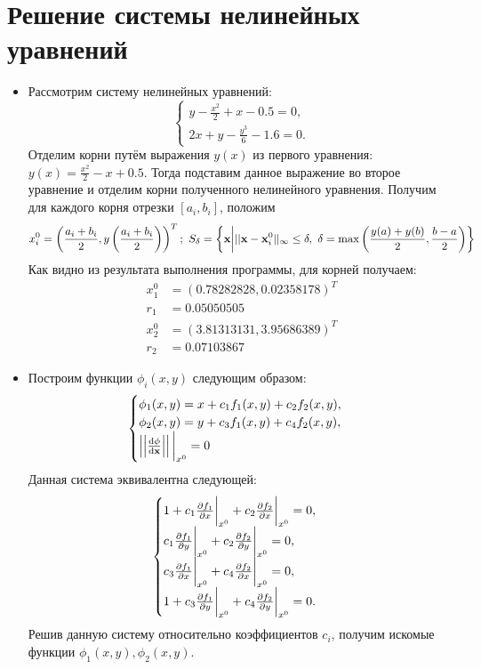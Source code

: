 \documentclass[14pt, a4paper]{article}
\begin{document}
  \section{Решение системы нелинейных уравнений}
  \begin{itemize}
    \item
    Рассмотрим систему нелинейных уравнений:
    $$\begin{cases}y - \frac{x^2}{2} + x - 0.5 = 0, \\ 2x + y - \frac{y^3}{6} - 1.6 = 0.\end{cases}$$
    Отделим корни путём выражения $y(x)$ из первого уравнения: $y(x) = \frac{x^2}{2} - x + 0.5$. Тогда подставим данное выражение во второе уравнение и отделим корни
    полученного нелинейного уравнения. Получим для каждого корня отрезки $[a_i, b_i]$, положим \begin{equation}x_i^0 = \left(\frac{a_i+b_i}{2}, y\left(\frac{a_i+b_i}{2}\right)\right)^T;
    \ S_{\delta} = \left\{ \bold{x} \bigg| ||\bold{x} - \bold{x}_i^0||_{\infty} \leq \delta, \ \delta = \max \left(\frac{y(a) + y(b)}{2}, \frac{b - a}{2} \right) \right\}\end{equation}
    Как видно из результата выполнения программы, для корней получаем:
    \begin{align*}x_1^0 &= \left(0.78282828, 0.02358178\right)^T \\ r_1 &= 0.05050505 \\ x_2^0 &= \left(3.81313131, 3.95686389\right)^T \\ r_2 &= 0.07103867\end{align*}
    \item
    Построим функции $\phi_i(x, y)$ следующим образом:
    \begin{equation}\begin{cases}\phi_1(x, y) = x + c_1f_1(x, y) + c_2f_2(x, y), \\ \phi_2(x, y) = y + c_3f_1(x, y) + c_4f_2(x, y), \\ \left|\left|\dv{\bold{\phi}}{\bold{x}}\right|\right|\bigg|_{x^0} = 0\end{cases}\end{equation}
    Данная система эквивалентна следующей:
    \begin{equation}\begin{cases}1 + c_1\pdv{f_1}{x}\bigg|_{x^0} + c_2\pdv{f_2}{x}\bigg|_{x^0} = 0, \\ c_1\pdv{f_1}{y}\bigg|_{x^0} + c_2\pdv{f_2}{y}\bigg|_{x^0} = 0, \\
 c_3\pdv{f_1}{x}\bigg|_{x^0} + c_4\pdv{f_2}{x}\bigg|_{x^0} = 0, \\ 1 + c_3\pdv{f_1}{y}\bigg|_{x^0} + c_4\pdv{f_2}{y}\bigg|_{x^0} = 0.\end{cases}\end{equation}
    Решив данную систему относительно коэффициентов $c_i$, получим искомые функции $\phi_1(x, y), \phi_2(x, y)$.
  \end{itemize}
\end{document}

